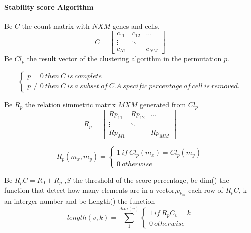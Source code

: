 \documentclass[12pt]{article}
\begin{document}
\setcounter{page}{35}



\paragraph{Stability score Algorithm}
Be $C$ the count matrix with $NXM$ genes and cells.
\[
C = \begin{bmatrix} 
    c_{11} & c_{12} & \dots \\
    \vdots & \ddots & \\
    c_{N1} &        & c_{NM} 
    \end{bmatrix}
\]
Be $Cl_p$ the result vector of the clustering algorithm in the permutation $p$.



 \[
   \left\{
                \begin{array}{ll}
                  p = 0 \ then \ C \ is \ complete\\
                  p \neq 0 \ then \ C \ is \ a \ subset \ of \ C. A \ specific\ percentage\ of\ cell\ is\ removed. 
                \end{array}
              \right.
  \]
  
 Be $R_p$ the relation simmetric matrix $MXM$ generated from $Cl_p$   
\[
R_p = \begin{bmatrix} 
    Rp_{11} & Rp_{12} & \dots \\
    \vdots & \ddots & \\
    Rp_{M1} &        & Rp_{MM} 
    \end{bmatrix}
\]

 \[
   R_p(m_x,m_y)=\left\{
                \begin{array}{ll}
                 1 \ if \ Cl_p(m_x)=Cl_p(m_y)\\
                 0 \ otherwise 
                \end{array}
              \right.
  \]

Be $R_pC = R_0 + R_p$ ,$S$ the threshold of the score percentage, be dim() the function that detect how many elements are in a vector,$v_{p_m}$ each row of $R_pC$, k an interger number and be Length() the function 
 \[
   length(v,k)=\sum\limits_{1}^{dim(v)}\left\{
                \begin{array}{ll}
                 1 \ if \ R_pC_{v} = k\\
                 0 \ otherwise 
                \end{array}
              \right.
  \]
  
\end{document}
